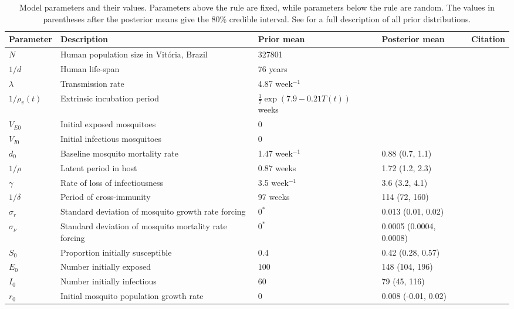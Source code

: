 \documentclass[10pt,letterpaper]{article}
\begin{document}
\begin{table}[!ht]
\label{parameters}
\begin{adjustwidth}{-2.25in}{0in} 
\begin{center}
\caption{Model parameters and their values.  Parameters above the rule are fixed, while parameters below the rule are random.  The values in parentheses after the posterior means give the 80$\%$ credible interval. See  for a full description of all prior distributions.}
\begin{tabular}{lp{6cm}lll}
Parameter & Description & Prior mean & Posterior mean & Citation\\
\hline
$N$ & Human population size in Vit\'oria, Brazil & 327801 & & \cite{vitpop} \\
$1/d$ & Human life-span & 76 years & &\cite{vitlong} \\
$\lambda$ & Transmission rate & 4.87 week$^{-1}$ & & \cite{Scott2000}\\
$1/\rho_{v}(t)$ & Extrinsic incubation period & $\frac{1}{7}\exp\left(7.9 - 0.21 T(t) \right)$ weeks & & \cite{Chan2012}\\
$V_{E0}$ & Initial exposed mosquitoes &  0 & &\\
$V_{I0}$ & Initial infectious mosquitoes & 0 & &\\
\hline
$d_0$ & Baseline mosquito mortality rate & 1.47 week$^{-1}$ & 0.88 (0.7, 1.1) &  \cite{Brady2013} \\
$1/\rho$ & Latent period in host & 0.87 weeks  & 1.72 (1.2, 2.3) &  \cite{Chan2012}\\
$\gamma$ & Rate of loss of infectiousness & 3.5 week$^{-1}$ & 3.6 (3.2, 4.1) & \cite{Nguyet2013}\\
$1/\delta$ & Period of cross-immunity & 97 weeks &  114 (72, 160) & \cite{Reich2013}\\
$\sigma_r$ & Standard deviation of mosquito growth rate forcing & $0^*$ & 0.013 (0.01, 0.02) &\\
$\sigma_{\nu}$ & Standard deviation of mosquito mortality rate forcing & $0^*$ & 0.0005 (0.0004, 0.0008) & \\
$S_0$ & Proportion initially susceptible & 0.4 & 0.42 (0.28, 0.57)& \cite{Cardoso2011a} \\
$E_0$ & Number initially exposed & $100$ & 148 (104, 196) & \\
$I_0$ & Number initially infectious & $60$ & 79 (45, 116) &\\
$r_0$ & Initial mosquito population growth rate & 0 & 0.008 (-0.01, 0.02) &\\

\end{tabular}
\end{center}
\end{adjustwidth}
\end{table}
\end{document}
